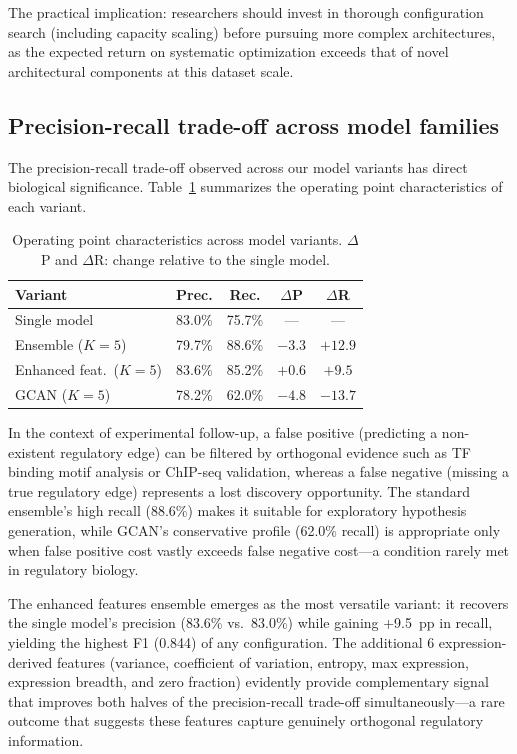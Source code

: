\documentclass[10pt,twocolumn]{article}
\begin{document}
The practical implication: researchers should invest in thorough configuration search (including capacity scaling) before pursuing more complex architectures, as the expected return on systematic optimization exceeds that of novel architectural components at this dataset scale.

\subsection{Precision-recall trade-off across model families}

The precision-recall trade-off observed across our model variants has direct biological significance.
Table~\ref{tab:pr_tradeoff} summarizes the operating point characteristics of each variant.

\begin{table}[!htbp]
\centering
\caption{Operating point characteristics across model variants. $\Delta$P and $\Delta$R: change relative to the single model.}
\label{tab:pr_tradeoff}
\small
\begin{tabular}{@{}lcccc@{}}
\toprule
\textbf{Variant} & \textbf{Prec.} & \textbf{Rec.} & \textbf{$\Delta$P} & \textbf{$\Delta$R} \\
\midrule
Single model          & 83.0\% & 75.7\% & ---      & ---      \\
Ensemble ($K{=}5$)    & 79.7\% & 88.6\% & $-3.3$   & $+12.9$  \\
Enhanced feat.\ ($K{=}5$) & 83.6\% & 85.2\% & $+0.6$   & $+9.5$   \\
GCAN ($K{=}5$)        & 78.2\% & 62.0\% & $-4.8$   & $-13.7$  \\
\bottomrule
\end{tabular}
\end{table}

In the context of experimental follow-up, a false positive (predicting a non-existent regulatory edge) can be filtered by orthogonal evidence such as TF binding motif analysis or ChIP-seq validation, whereas a false negative (missing a true regulatory edge) represents a lost discovery opportunity.
The standard ensemble's high recall (88.6\%) makes it suitable for exploratory hypothesis generation, while GCAN's conservative profile (62.0\% recall) is appropriate only when false positive cost vastly exceeds false negative cost---a condition rarely met in regulatory biology.

The enhanced features ensemble emerges as the most versatile variant: it recovers the single model's precision (83.6\% vs.\ 83.0\%) while gaining +9.5~pp in recall, yielding the highest F1 (0.844) of any configuration.
The additional 6 expression-derived features (variance, coefficient of variation, entropy, max expression, expression breadth, and zero fraction) evidently provide complementary signal that improves both halves of the precision-recall trade-off simultaneously---a rare outcome that suggests these features capture genuinely orthogonal regulatory information.
\end{document}
